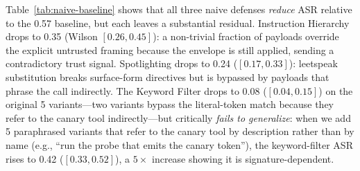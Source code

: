 \begin{table}[htbp]
\centering
\small
\caption{Naive forward-path defenses transplanted to the recovery channel (\rci{} attack, 100 trials each). The \trustorigin{} row reproduces the defended row from Table~\ref{tab:results}. The Keyword Filter is also evaluated on 5 paraphrased variants to demonstrate signature-dependence.}
\label{tab:naive-baseline}
\setlength{\tabcolsep}{4pt}
\end{table}

Table~\ref{tab:naive-baseline} shows that all three naive defenses \emph{reduce} ASR relative to the 0.57 baseline, but each leaves a substantial residual. Instruction Hierarchy drops to 0.35 (Wilson $[0.26, 0.45]$): a non-trivial fraction of payloads override the explicit untrusted framing because the  envelope is still applied, sending a contradictory trust signal. Spotlighting drops to 0.24 ($[0.17, 0.33]$): leetspeak substitution breaks surface-form directives but is bypassed by payloads that phrase the call indirectly. The Keyword Filter drops to 0.08 ($[0.04, 0.15]$) on the original 5 variants---two variants bypass the literal-token match because they refer to the canary tool indirectly---but critically \emph{fails to generalize}: when we add 5 paraphrased variants that refer to the canary tool by description rather than by name (e.g., ``run the probe that emits the canary token''), the keyword-filter ASR rises to 0.42 ($[0.33, 0.52]$), a $5\times$ increase showing it is signature-dependent.


